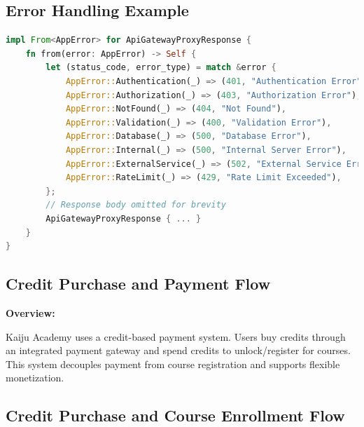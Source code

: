 \documentclass[a4paper, 11pt]{scrreprt}
\begin{document}
\subsection{Error Handling Example}
\begin{lstlisting}[language=Rust]
impl From<AppError> for ApiGatewayProxyResponse {
    fn from(error: AppError) -> Self {
        let (status_code, error_type) = match &error {
            AppError::Authentication(_) => (401, "Authentication Error"),
            AppError::Authorization(_) => (403, "Authorization Error"),
            AppError::NotFound(_) => (404, "Not Found"),
            AppError::Validation(_) => (400, "Validation Error"),
            AppError::Database(_) => (500, "Database Error"),
            AppError::Internal(_) => (500, "Internal Server Error"),
            AppError::ExternalService(_) => (502, "External Service Error"),
            AppError::RateLimit(_) => (429, "Rate Limit Exceeded"),
        };
        // Response body omitted for brevity
        ApiGatewayProxyResponse { ... }
    }
}
\end{lstlisting}

\subsection{Credit Purchase and Payment Flow}

\textbf{Overview:}

Kaiju Academy uses a credit-based payment system. Users buy credits through an integrated payment gateway and spend credits to unlock/register for courses. This system decouples payment from course registration and supports flexible monetization.

\subsection{Credit Purchase and Course Enrollment Flow}
\end{document}
